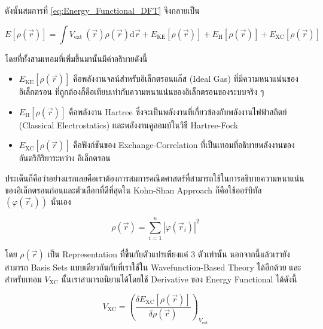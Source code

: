 \noindent ดังนั้นสมการที่ \eqref{eq:Energy_Functional_DFT} จึงกลายเป็น

\begin{equation}
  E[\rho(\vec{r})]
  =
  \int V_{\text{ext }}(\vec{r}) \rho(\vec{r}) \mathrm{d} \vec{r}
  + E_{\text{KE}}[\rho(\vec{r})]
  + E_{\text{H}}[\rho(\vec{r})]
  + E_{\text{XC}}[\rho(\vec{r})]
\end{equation}

\noindent โดยที่ทั้งสามเทอมที่เพิ่มขึ้นมานั้นมีคำอธิบายดังนี้

\begin{itemize}[topsep=0pt,noitemsep]
  \setlength\itemsep{1em}
  \item $E_{\text{KE}}[\rho(\vec{r})]$ คือพลังงานจลน์สำหรับอิเล็กตรอนแก๊ส (Ideal Gas) ที่มีความหนาแน่นของอิเล็กตรอน%
        ที่ถูกต้องก็คือเทียบเท่ากับความหนาแน่นของอิเล็กตรอนของระบบจริง ๆ

  \item $E_{\text{H}}[\rho(\vec{r})]$ คือพลังงาน Hartree ซึ่งจะเป็นพลังงานที่เกี่ยวข้องกับพลังงานไฟฟ้าสถิตย์ (Classical
        Electrostatics) และพลังงานคูลอมบ์ในวิธี Hartree-Fock

  \item $E_{\text{XC}}[\rho(\vec{r})]$ คือฟังก์ชันของ Exchange-Correlation ที่เป็นเทอมที่อธิบายพลังงานของอันตริกิริยาระหว่าง%
        อิเล็กตรอน
\end{itemize}

ประเด็นก็คือว่าอย่างแรกเลยคือเราต้องการสมการคณิตศาสตร์ที่สามารถใช้ในการอธิบายความหนาแน่นของอิเล็กตรอนก่อนและตัวเลือกที่ดีที่สุดใน Kohn-Shan
Approach ก็คือใช้ออร์บิทัล $(\varphi\left(\vec{r}_i\right))$ นั่นเอง

\begin{equation}
  \label{eq:Electron_Density}
  \rho(\vec{r})
  =
  \sum_{i=1}^n
  \left|
  \varphi\left(\vec{r}_i\right)
  \right|^2
\end{equation}

\noindent โดย $\rho(\vec{r})$ เป็น Representation ที่ขึ้นกับตัวแปรเพียงแค่ 3 ตัวเท่านั้น นอกจากนี้แล้วเรายังสามารถ Basis Sets
แบบเดียวกันกับที่เราใช้ใน Wavefunction-Based Theory ได้อีกด้วย และสำหรับเทอม $V_{\mathrm{XC}}$ นั้นเราสามารถนิยามได้โดยใช้
Derivative ของ Energy Functional ได้ดังนี้

\begin{equation}
  V_{\mathrm{XC}}
  =
  \left(
  \frac
  {
    \delta E_{\mathrm{XC}}[\rho(\vec{r})]
  }
  {
    \delta \rho(\vec{r})
  }
  \right)_{V_{\mathrm{ext}}}
\end{equation}

